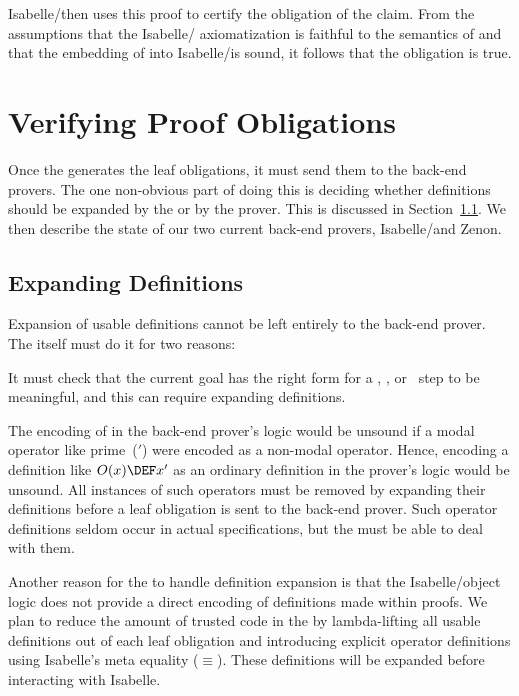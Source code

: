 \documentclass[a4paper]{easychair}
\begin{document}
\noindent Isabelle/\tlaplus then uses this proof to certify the obligation of
the claim. From the assumptions that the Isabelle/\tlaplus
axiomatization is faithful to the semantics of \tlatwo and that the
embedding of \tlatwo into Isabelle/\tlaplus is sound, it follows that
the obligation is true.

\section{Verifying Proof Obligations}
\label{sec:backend}

Once the \PM generates the leaf obligations, it must send them to the
back-end provers.  The one non-obvious part of doing this is deciding
whether definitions should be expanded by the \PM or by the prover.
This is discussed in Section~\ref{sec:backend.pm}.  We then describe
the state of our two current back-end provers, Isabelle/\tlaplus and
Zenon.

\subsection{Expanding Definitions}
\label{sec:backend.pm}

Expansion of usable definitions cannot be left entirely to the
back-end prover.  The \PM itself must do it for two reasons:
\begin{icom}
\item It must check that the current goal has the right form for a
  \TAKE, \WITNESS, or \HAVE\ step to be meaningful, and this can require
  expanding definitions.

\item The encoding of \tlaplus in the back-end prover's logic would be
  unsound if a modal operator like prime~($'$) were encoded as a
  non-modal operator. Hence, encoding a definition like $O(x)\DEF x'$
  as an ordinary definition in the prover's logic would be unsound.
  All instances of such operators must be removed by expanding their
  definitions before a leaf obligation is sent to the back-end prover.
Such operator definitions seldom occur in actual \tlaplus
  specifications, but the \PM must be able to deal with them.
\end{icom}
Another reason for the \PM to handle definition expansion is that the
Isabelle/\tlaplus object logic does not provide a direct encoding of
definitions made within proofs. We plan to reduce the amount of
trusted code in the \PM by lambda-lifting all usable definitions out
of each leaf obligation and introducing explicit operator definitions
using Isabelle's meta equality ($\equiv$). These definitions will be
expanded before interacting with Isabelle.
\end{document}
